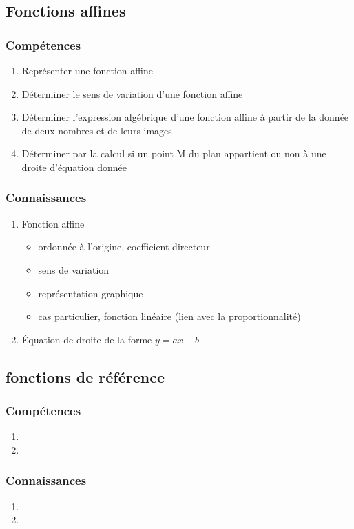 \documentclass[12pt,a4paper]{article}
\begin{document}
\subsection{Fonctions affines}
\begin{multicols}{2}
	\subsubsection*{Compétences}
	\begin{enumerate}
		\item Représenter une fonction affine
		\item Déterminer le sens de variation d'une fonction affine
		\item Déterminer l'expression algébrique d'une fonction affine à partir de la donnée de deux nombres et de leurs images
		\item Déterminer par la calcul si un point M du plan appartient ou non à une droite d'équation donnée
	\end{enumerate}
	
	\subsubsection*{Connaissances}
	
	\begin{enumerate}
		
		\item Fonction affine
		\begin{itemize}
			\item ordonnée à l'origine, coefficient directeur
			\item sens de variation
			\item représentation graphique
			\item cas particulier, fonction linéaire (lien avec la proportionnalité)
			
		\end{itemize}
		\item \'Equation de droite de la forme $y=ax+b$
	\end{enumerate}
\end{multicols}

\subsection{fonctions de référence}
\begin{multicols}{2}
	\subsubsection*{Compétences}
	\begin{enumerate}
		\item 
		\item 
	\end{enumerate}
	
	\subsubsection*{Connaissances}
	\begin{enumerate}
		\item 
		\item 
	\end{enumerate}
\end{multicols}
\end{document}
